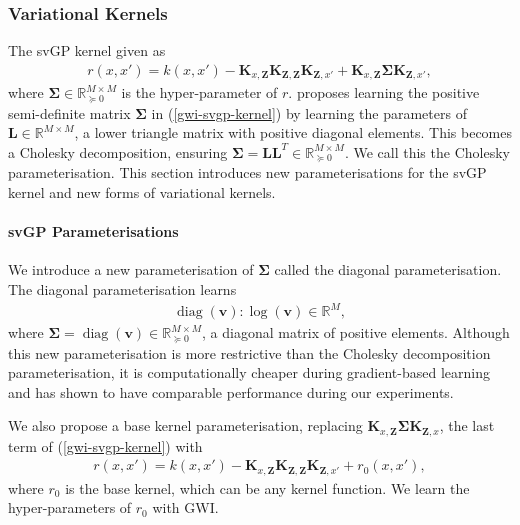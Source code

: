 \documentclass{article}
\newcommand{\diag}{\operatorname{diag}}
\numberwithin{equation}{section}
\begin{document}
\subsubsection{Variational Kernels}\label{variational-kernels}
The svGP kernel given as
\begin{align}
    r(x, x') = k(x, x') - \mathbf{K}_{x, \mathbf{Z}} \mathbf{K}_{\mathbf{Z}, \mathbf{Z}} \mathbf{K}_{\mathbf{Z}, x'} + \mathbf{K}_{x, \mathbf{Z}} \mathbf{\Sigma} \mathbf{K}_{\mathbf{Z}, x'},
    \label{gwi-svgp-kernel}
\end{align}
where $\mathbf{\Sigma} \in \mathbb{R}^{M \times M}_{\succcurlyeq 0}$ is the hyper-parameter of $r$. 
\cite{wild2022generalized} proposes learning the positive semi-definite matrix $\mathbf{\Sigma}$ in  (\ref{gwi-svgp-kernel}) by learning the parameters of $\mathbf{L} \in \mathbb{R}^{M \times M}$, a lower triangle matrix with positive diagonal elements.
This becomes a Cholesky decomposition, ensuring $\mathbf{\Sigma} = \mathbf{L}\mathbf{L}^T \in \mathbb{R}^{M \times M}_{\succcurlyeq 0}$. 
We call this the Cholesky parameterisation. 
This section introduces new parameterisations for the svGP kernel and new forms of variational kernels.




\paragraph{svGP Parameterisations}
We introduce a new parameterisation of $\mathbf{\Sigma}$ called the diagonal parameterisation. The diagonal parameterisation learns
\begin{align}
    \diag(\mathbf{v}): \log(\mathbf{v}) \in \mathbb{R}^M,
\end{align}
where $\mathbf{\Sigma} = \diag(\mathbf{v}) \in \mathbb{R}^{M \times M}_{\succcurlyeq 0}$, a diagonal matrix of positive elements. 
Although this new parameterisation is more restrictive than the Cholesky decomposition parameterisation, it is computationally cheaper during gradient-based learning and has shown to have comparable performance during our experiments.

We also propose a base kernel parameterisation, replacing $\mathbf{K}_{x, \mathbf{Z}} \mathbf{\Sigma} \mathbf{K}_{\mathbf{Z}, x}$, the last term of (\ref{gwi-svgp-kernel}) with
\begin{align}
    r(x, x') = k(x, x') - \mathbf{K}_{x, \mathbf{Z}} \mathbf{K}_{\mathbf{Z}, \mathbf{Z}} \mathbf{K}_{\mathbf{Z}, x'} + r_0(x, x'),
\end{align}
where $r_0$ is the base kernel, which can be any kernel function. We learn the hyper-parameters of $r_0$ with GWI.
\end{document}
